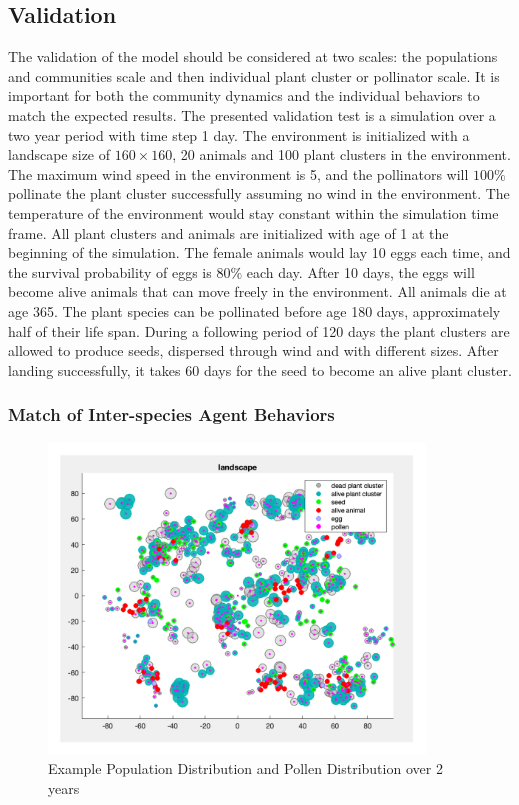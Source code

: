 \documentclass[3p,,preprint,12pt]{elsarticle}
\begin{document}
\subsection{Validation}
The validation of the model should be considered at two scales: the populations and communities scale and then individual plant cluster or pollinator scale. It is important for both the community dynamics and the individual behaviors to match the expected results. The presented validation test is a simulation over a two year period with time step 1 day. The environment is initialized with a landscape size of $160\times160$, 20 animals and 100 plant clusters in the environment. The maximum wind speed in the environment is 5, and the pollinators will $100\%$ pollinate the plant cluster successfully assuming no wind in the environment. The temperature of the environment would stay constant within the simulation time frame. All plant clusters and animals are initialized with age of 1 at the beginning of the simulation. The female animals would lay 10 eggs each time, and the survival probability of eggs is $80\%$ each day. After 10 days, the eggs will become alive animals that can move freely in the environment. All animals die at age 365. The plant species can be pollinated before age 180 days, approximately half of their life span. During a following period of 120 days the plant clusters are allowed to produce seeds, dispersed through wind and with different sizes. After landing successfully, it takes 60 days for the seed to become an alive plant cluster.

\subsubsection{Match of Inter-species Agent Behaviors}

    \begin{figure}[!htb]
    \begin{center}
    \includegraphics[width=100mm]{figures/validation_4.png} 
    \caption{Example Population Distribution and Pollen Distribution over 2 years}
    \end{center}
    \end{figure}
\end{document}
